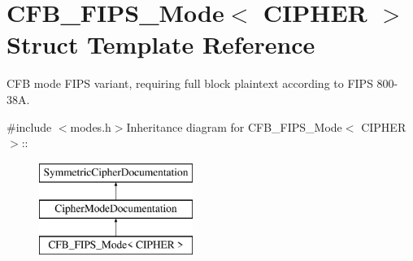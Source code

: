 \hypertarget{struct_c_f_b___f_i_p_s___mode}{
\section{CFB\_\-FIPS\_\-Mode$<$ CIPHER $>$ Struct Template Reference}
\label{struct_c_f_b___f_i_p_s___mode}
}


CFB mode FIPS variant, requiring full block plaintext according to FIPS 800-\/38A.  


{\ttfamily \#include $<$modes.h$>$}Inheritance diagram for CFB\_\-FIPS\_\-Mode$<$ CIPHER $>$::\begin{figure}[H]
\begin{center}
\leavevmode
\includegraphics[height=3cm]{struct_c_f_b___f_i_p_s___mode}
\end{center}
\end{figure}
